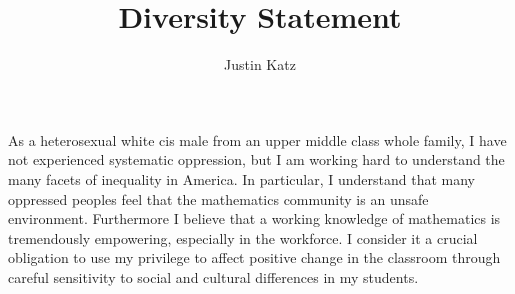 \documentclass[11pt]{amsart}
\title{Diversity Statement}
\author{Justin Katz}
\begin{document}
\maketitle
As a heterosexual white cis male from an upper middle class whole family, I have not experienced systematic oppression, but I am working hard to understand the many facets of inequality in America. In particular, I understand that many oppressed peoples feel that the mathematics community is an unsafe environment. Furthermore I believe that a working knowledge of mathematics is tremendously empowering, especially in the workforce. I consider it a crucial obligation to use my privilege to affect positive change in the classroom through careful sensitivity to social and cultural differences in my students. 
\end{document}
